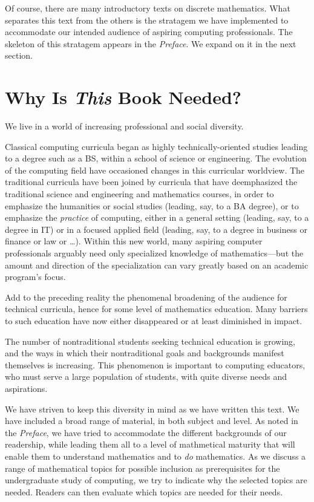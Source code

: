 \bigskip

Of course, there are many introductory texts on discrete mathematics.
What separates this text from the others is the stratagem we have
implemented to accommodate our intended audience of aspiring computing
professionals.  The skeleton of this stratagem appears in the {\it
  Preface}.  We expand on it in the next section.



\section{Why Is {\em This} Book Needed?}
\label{sec:thisbookneed}

We live in a world of increasing professional and social diversity.

\medskip

Classical computing curricula began as highly technically-oriented
studies leading to a degree such as a BS, within a school of science
or engineering.  The evolution of the computing field have occasioned
changes in this curricular worldview.  The traditional curricula have
been joined by curricula that have deemphasized the traditional
science and engineering and mathematics courses, in order to emphasize
the humanities or social studies (leading, say, to a BA degree), or to
emphasize the {\em practice} of computing, either in a general setting
(leading, say, to a degree in IT) or in a focused applied field
(leading, say, to a degree in business or finance or law or \ldots).
Within this new world, many aspiring computer professionals arguably
need only specialized knowledge of mathematics---but the amount and
direction of the specialization can vary greatly based on an academic
program's focus.

\medskip

Add to the preceding reality the phenomenal broadening of the audience
for technical curricula, hence for some level of mathematics
education.  Many barriers to such education have now either
disappeared or at least diminished in impact.

\medskip

The number of nontraditional students seeking technical education is
growing, and the ways in which their nontraditional goals and
backgrounds manifest themselves is increasing.  This phenomenon is
important to computing educators, who must serve a large population of
students, with quite diverse needs and aspirations.

We have striven to keep this diversity in mind as we have written this
text.  We have included a broad range of material, in both subject and
level.  As noted in the {\it Preface}, we have tried to accommodate
the different backgrounds of our readership, while leading them all to
a level of mathmetical maturity that will enable them to understand
mathematics and to {\em do} mathematics.  As we
discuss a range of mathematical topics for possible inclusion as
prerequisites for the undergraduate study of computing, we try to
indicate why the selected topics are needed.  Readers can then
evaluate which topics are needed for their needs.

